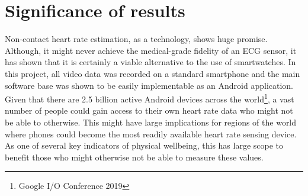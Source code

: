 

\section{Significance of results}
Non-contact heart rate estimation, as a technology, shows huge promise. Although, it might never achieve the medical-grade 
fidelity of an ECG sensor, it has shown that it is certainly a viable alternative to the use of smartwatches. In this project, all video data was 
recorded on a standard smartphone and the main software base was shown to be easily implementable as an Android application.
Given that there are 2.5 billion active Android devices across the world\footnote{Google I/O Conference 2019}, a vast number of people could gain access
to their own heart rate data who might not be able to otherwise. This might have large implications
for regions of the world where phones could become the most readily available heart rate sensing device. 
As one of several key indicators of physical wellbeing, this has large scope to benefit those who might otherwise not be able to measure these values.


